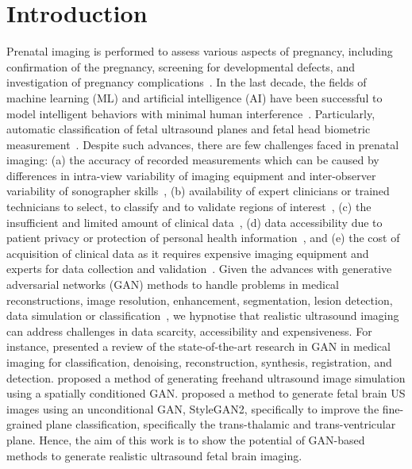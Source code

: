 \documentclass{midl} %
\begin{document}
\section{Introduction}
Prenatal imaging is performed to assess various aspects of pregnancy, including confirmation of the pregnancy, screening for developmental defects, and investigation of pregnancy complications~\citep{Kline-Fath2007}.
In the last decade, the fields of machine learning (ML) and artificial intelligence (AI) have been successful to model intelligent behaviors with minimal human interference~\citep{Hamet2017}.
Particularly, automatic classification of fetal ultrasound planes and fetal head biometric measurement~\citep{Burgos-Artizzu2020-1, Sinclair2018, fiorentino2022_arxiv}.
Despite such advances, there are few challenges faced in prenatal imaging:
(a) the accuracy of recorded measurements which can be caused by differences in intra-view variability of imaging equipment and inter-observer variability of sonographer skills~\citep{NHS2015, Sarris2012, Villar1989, Kesmodel2018},
(b) availability of expert clinicians or trained technicians to select, to classify and to validate regions of interest~\citep{Burgos-Artizzu2020},
(c) the insufficient and limited amount of clinical data~\citep{Jang2018, Sinclair2018, He2021}, 
(d) data accessibility due to patient privacy or protection of personal health information~\citep{Shin2018}, and 
(e) the cost of acquisition of clinical data
as it requires expensive imaging equipment and experts for data collection and validation~\citep{Wang2019, Kim2019}.
Given the advances with generative adversarial networks (GAN) methods to handle problems in medical reconstructions, image resolution, enhancement, segmentation, lesion detection, data simulation or classification~\citep{2022_AlAmir_GANMedicalSurvey}, we hypnotise that realistic ultrasound imaging can address challenges in data scarcity, accessibility and expensiveness.
For instance, \citet{Kazeminia2020} presented a review of the state-of-the-art research in GAN in medical imaging for classification, denoising, reconstruction, synthesis, registration, and detection.
\citet{Hu2017} proposed a method of generating freehand ultrasound image simulation using a spatially conditioned GAN.
\citet{Montero2021} proposed a method to generate fetal brain US images using an unconditional GAN, StyleGAN2, specifically to improve the fine-grained plane classification, specifically the trans-thalamic and trans-ventricular plane.
Hence, the aim of this work is to show the potential of GAN-based methods to generate realistic ultrasound fetal brain imaging.
\end{document}
